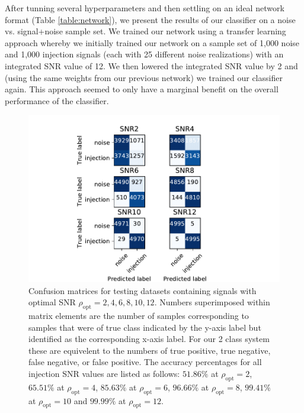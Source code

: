\documentclass[%
showpacs,
 amsmath,amssymb,
 aps,
 twocolumn,
 prl,
 reprint,
floatfix,
]{revtex4-1}
\newcommand{\optsnr}{\rho_{\mathrm{opt}}}
\begin{document}
%
%
After tunning several hyperparameters and then settling on
an ideal network format (Table \ref{table:network}), we present the results of
our classifier on a noise vs. signal+noise sample set. We trained our network
using a transfer learning approach whereby we initially trained our network on
a sample set of 1,000 noise and 1,000 injection signals (each with 25 different
noise realizations) with an integrated SNR value of 12. We then lowered the
integrated SNR value by 2 and (using the same weights from our previous
network) we trained our classifier again. This approach seemed to only have a
marginal benefit on the overall performance of the classifier.  

%
%
\begin{figure}[]
\includegraphics[width=\columnwidth] {figures/confusion_matrix.pdf}
\caption{Confusion matrices for testing datasets containing signals with
optimal SNR $\rho_{\mathrm{opt}}=2,4,6,8,10,12$.  Numbers superimposed within
matrix elements are the number of samples corresponding to samples that were of
true class indicated by the y-axis label but identified as the corresponding
x-axis label. For our 2 class system these are equivelent to the numbers of
true positive, true negative, false negative, or false positive. The accuracy
percentages for all injection SNR values are listed as follows: $51.86\%$ at
$\optsnr=2$, $65.51\%$ at $\optsnr=4$, $85.63\%$ at $\optsnr=6$, $96.66\%$ at
$\optsnr=8$, $99.41\%$ at $\optsnr=10$ and $99.99\%$ at
$\optsnr=12$.\label{fig:confusion}}
\end{figure}
\end{document}
